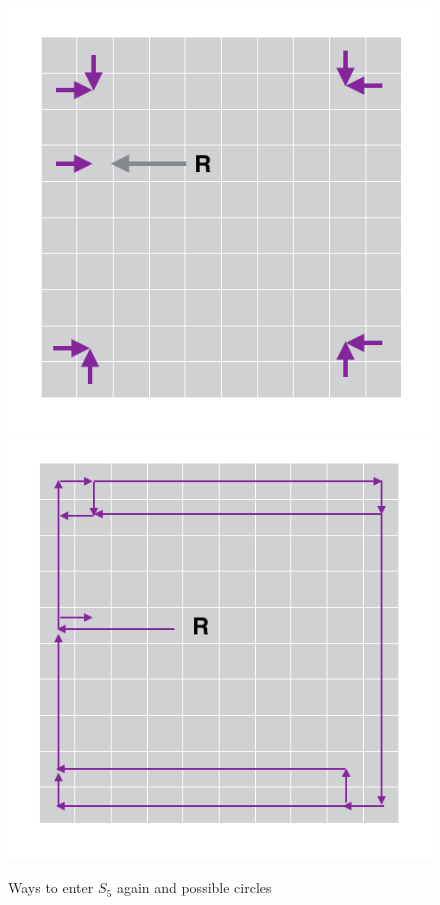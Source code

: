 \documentclass[paper=a4, fontsize=11pt]{scrartcl} %
\numberwithin{equation}{section} %
\numberwithin{figure}{section} %
\numberwithin{table}{section} %
\begin{document}
\begin{figure}[p]
    \includegraphics[scale=0.5]{image1.png}
    \hspace{\fill}
    \includegraphics[scale=0.5]{image2.png}
    \caption{Ways to enter $S_5$ again and possible circles}
    \label{fig:Problem1.2.1}

\end{figure}
\end{document}
